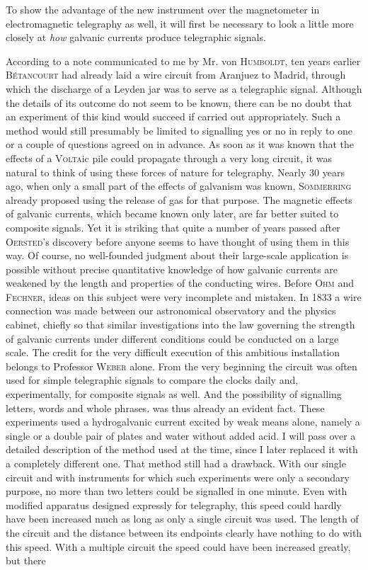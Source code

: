 To show the advantage of the new instrument over the magnetometer in electromagnetic telegraphy as well, it will first be necessary to look a little more closely at \textit{how} galvanic currents produce telegraphic signals.

\expandafter\def\csname HistoricalNoteText375\endcsname{According to a note communicated to me by Mr. von \textsc{Humboldt}, ten years earlier \textsc{Bétancourt} had already laid a wire circuit from Aranjuez to Madrid, through which the discharge of a Leyden jar was to serve as a telegraphic signal. Although the details of its outcome do not seem to be known, there can be no doubt that an experiment of this kind would succeed if carried out appropriately. Such a method would still presumably be limited to signalling yes or no in reply to one or a couple of questions agreed on in advance.}
As soon as it was known that the effects of a \textsc{Volta}ic pile could propagate through a very long circuit, it was natural to think of using these forces of nature for telegraphy. Nearly 30 years ago, when only a small part of the effects of galvanism was known, \textsc{Sömmerring} already proposed using the release of gas for that purpose. The magnetic effects of galvanic currents, which became known only later, are far better suited to composite signals. Yet it is striking that quite a number of years passed after \textsc{Oersted}’s discovery before anyone seems to have thought of using them in this way. Of course, no well-founded judgment about their large-scale application is possible without precise quantitative knowledge of how galvanic currents are weakened by the length and properties of the conducting wires. Before \textsc{Ohm} and \textsc{Fechner}, ideas on this subject were very incomplete and mistaken. In 1833 a wire connection was made between our astronomical observatory and the physics cabinet, chiefly so that similar investigations into the law governing the strength of galvanic currents under different conditions could be conducted on a large scale. The credit for the very difficult execution of this ambitious installation belongs to Professor \textsc{Weber} alone. From the very beginning the circuit was often used for simple telegraphic signals to compare the clocks daily and, experimentally, for composite signals as well. And the possibility of signalling letters, words and whole phrases. was thus already an evident fact. These experiments used a hydrogalvanic current excited by weak means alone, namely a single or a double pair of plates and water without added acid. I will pass over a detailed description of the method used at the time, since I later replaced it with a completely different one. That method still had a drawback. With our single circuit and with instruments for which such experiments were only a secondary purpose, no more than two letters could be signalled in one minute. Even with modified apparatus designed expressly for telegraphy, this speed could hardly have been increased much as long as only a single circuit was used. The length of the circuit and the distance between its endpoints clearly have nothing to do with this speed. With a multiple circuit the speed could have been increased greatly, but there 